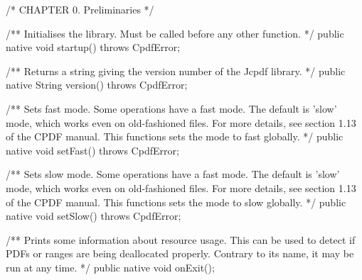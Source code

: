 /* CHAPTER 0. Preliminaries */

/** Initialises the library. Must be called before any other function. */
public native void startup() throws CpdfError;

/** Returns a string giving the version number of the Jcpdf library. */
public native String version() throws CpdfError;

/** Sets fast mode. Some operations have a fast mode. The default is 'slow'
mode, which works even on old-fashioned files. For more details, see
section 1.13 of the CPDF manual. This functions sets the mode to fast
globally. */
public native void setFast() throws CpdfError;

/** Sets slow mode. Some operations have a fast mode. The default is 'slow'
mode, which works even on old-fashioned files. For more details, see
section 1.13 of the CPDF manual. This functions sets the mode to slow
globally. */
public native void setSlow() throws CpdfError;

/** Prints some information about
resource usage. This can be used to detect if PDFs or ranges are being
deallocated properly. Contrary to its name, it may be run at any time. */
public native void onExit();
